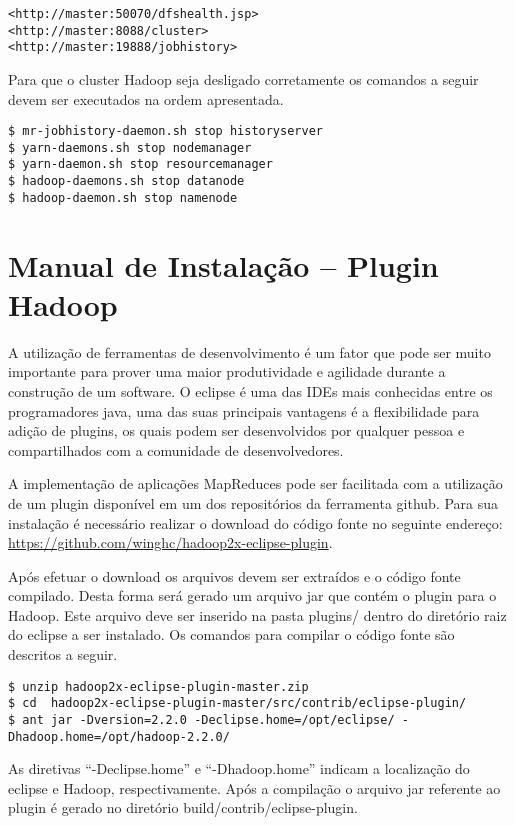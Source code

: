 \begin{apendicesenv}
\begin{lstlisting}[style=abnt,frame=single]
<http://master:50070/dfshealth.jsp>
<http://master:8088/cluster>
<http://master:19888/jobhistory>
\end{lstlisting}

Para que o cluster Hadoop seja desligado corretamente os comandos a seguir devem ser executados na ordem apresentada.

\begin{lstlisting}[style=abnt,frame=single]
$ mr-jobhistory-daemon.sh stop historyserver 
$ yarn-daemons.sh stop nodemanager 
$ yarn-daemon.sh stop resourcemanager 
$ hadoop-daemons.sh stop datanode 
$ hadoop-daemon.sh stop namenode
\end{lstlisting}

\chapter{Manual de Instalação – Plugin Hadoop}
\label{apd-eclipse}

A utilização de ferramentas de desenvolvimento é um fator que pode ser muito importante para prover uma maior produtividade e agilidade durante a construção de um software. O eclipse é uma das IDEs mais conhecidas entre os programadores java, uma das suas principais vantagens é a flexibilidade para adição de plugins, os quais podem ser desenvolvidos por qualquer pessoa e compartilhados com a comunidade de desenvolvedores.

A implementação de aplicações MapReduces pode ser facilitada com a utilização de um plugin disponível em um dos repositórios da ferramenta github. Para sua instalação é necessário realizar o download do código fonte no seguinte endereço: \url{https://github.com/winghc/hadoop2x-eclipse-plugin}.

Após efetuar o download os arquivos devem ser extraídos e o código fonte compilado. Desta forma será gerado um arquivo jar que contém o plugin para o Hadoop. Este arquivo deve ser inserido na pasta plugins/ dentro do diretório raiz do eclipse a ser instalado. Os comandos para compilar o código fonte são descritos a seguir.

\begin{lstlisting}[style=abnt,frame=single]
$ unzip hadoop2x-eclipse-plugin-master.zip
$ cd  hadoop2x-eclipse-plugin-master/src/contrib/eclipse-plugin/
$ ant jar -Dversion=2.2.0 -Declipse.home=/opt/eclipse/ -Dhadoop.home=/opt/hadoop-2.2.0/
\end{lstlisting}

As diretivas “-Declipse.home” e “-Dhadoop.home” indicam a localização do eclipse e Hadoop, respectivamente. Após a compilação o arquivo jar referente ao plugin é gerado no diretório  build/contrib/eclipse-plugin.

\end{apendicesenv}
